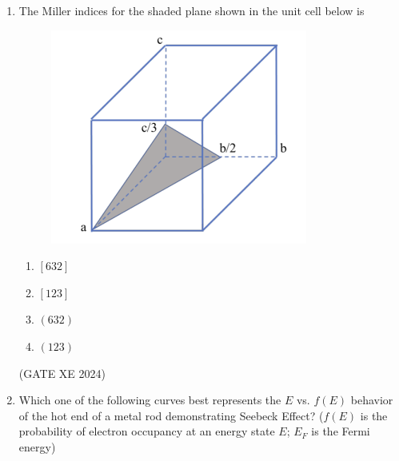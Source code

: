 \documentclass[12pt]{article}
\begin{document}
\begin{enumerate}
(GATE XE 2024)

\item The Miller indices for the shaded plane shown in the unit cell below is

\begin{figure}[H]
    \centering
    \includegraphics[width=0.5\columnwidth]{figs/ass5_c_q55.png}
    \caption{}
    \label{fig:placeholder}
\end{figure}

\begin{enumerate}
\item $[632]$
\item $[123]$
\item $(632)$
\item $(123)$
\end{enumerate}

(GATE XE 2024)

\item Which one of the following curves best represents the $E$ vs. $f(E)$ behavior of the hot end of a metal rod demonstrating Seebeck Effect? ($f(E)$ is the probability of electron occupancy at an energy state $E$; $E_F$ is the Fermi energy)


\end{enumerate}
\end{document}
